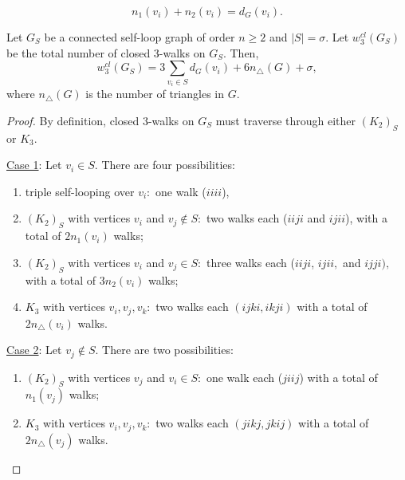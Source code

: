 \documentclass[10pt,a4paper]{amsart}
\begin{document}
\begin{equation}
\label{eq:n1n2}
n_1(v_i) + n_2(v_i) = d_G(v_i).
\end{equation} 

\begin{theorem}
\label{closed3}
Let $G_S$ be a connected self-loop graph of order $n\geq 2$ and $|S|=\sigma.$ Let $w^{cl}_3(G_S)$ be the total number of closed 3-walks on $G_S.$ Then,
\begin{equation}
\label{eq:closed3}
w^{cl}_3(G_S)= 3 \sum_{v_i \in S} d_G(v_i) + 6 n_\triangle(G) + \sigma, 
\end{equation}
where $n_\triangle(G)$ is the number of triangles in $G.$ 
\end{theorem}

\begin{proof}
By definition, closed 3-walks on $G_S$ must traverse through either $(K_2)_S$ or $K_3$. %

\underline{Case 1}: Let $v_i \in S.$ There are four possibilities: %
\begin{enumerate}
    \item triple self-looping over $v_i:$ one walk ($iiii$),
    \item $(K_2)_S$ with vertices $v_i$ and $v_j \notin S:$ two walks each ($iiji$ and $ijii$), with a total of \textbf{$2n_1(v_i)$} walks;
    \item $(K_2)_S$ with vertices $v_i$ and $v_j \in S:$ three walks each ($iiji$, $ijii,$ and $ijji),$ with a total of \textbf{$3n_2(v_i)$} walks;
    \item $K_3$ with vertices $v_i,v_j,v_k:$ two walks each $(ijki, ikji)$ with a total of $2n_\triangle(v_i)$ walks. 
\end{enumerate}

\underline{Case 2}: Let $v_j \notin S.$ There are two possibilities:
\begin{enumerate}
    \item $(K_2)_S$ with vertices $v_j$ and $v_i \in S:$ one walk each ($jiij$) with a total of \textbf{$n_1(v_j)$} walks;
    \item $K_3$ with vertices $v_i,v_j,v_k:$ two walks each $(jikj, jkij)$ with a total of $2n_\triangle(v_j)$ walks. 
\end{enumerate}


\end{proof}
\end{document}
